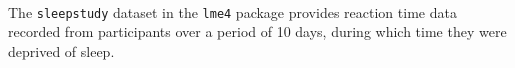 \documentclass[]{article}
\newenvironment{Shaded}{\begin{snugshade}}{\end{snugshade}}
\newcommand{\KeywordTok}[1]{\textcolor[rgb]{0.13,0.29,0.53}{\textbf{#1}}}
\newcommand{\DecValTok}[1]{\textcolor[rgb]{0.00,0.00,0.81}{#1}}
\newcommand{\StringTok}[1]{\textcolor[rgb]{0.31,0.60,0.02}{#1}}
\newcommand{\OperatorTok}[1]{\textcolor[rgb]{0.81,0.36,0.00}{\textbf{#1}}}
\newcommand{\NormalTok}[1]{#1}
\let\oldparagraph\paragraph
\renewcommand{\paragraph}[1]{\oldparagraph{#1}\mbox{}}
\theoremstyle{definition}
\theoremstyle{definition}
\theoremstyle{definition}
\theoremstyle{remark}
\begin{document}
\hypertarget{sleepstudy-rmanova}{\paragraph{}\label{sleepstudy-rmanova}}

The \texttt{sleepstudy} dataset in the \texttt{lme4} package provides
reaction time data recorded from participants over a period of 10 days,
during which time they were deprived of sleep.

\begin{Shaded}
\end{Shaded}
\end{document}
